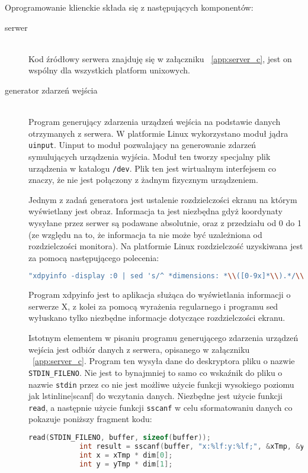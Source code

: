 Oprogramowanie klienckie składa się z następujących komponentów:
\begin{description}
	\item[serwer] \hfill \\
Kod źródłowy serwera znajduję się w załączniku ~\ref{app:server_c}, jest on wspólny dla wszystkich platform unixowych.		
	\item[generator zdarzeń wejścia] \hfill \\ 
		Program generujący zdarzenia urządzeń wejścia na podstawie danych otrzymanych z serwera. W platformie Linux wykorzystano moduł jądra \lstinline|uinput|. Uinput to moduł pozwalający na generowanie zdarzeń symulujących urządzenia wyjścia. Moduł ten tworzy specjalny plik urządzenia w katalogu \lstinline|/dev|. Plik ten jest wirtualnym interfejsem co znaczy, że nie jest połączony z żadnym fizycznym urządzeniem.

		Jednym z zadań generatora jest ustalenie rozdzielczości ekranu na którym wyświetlany jest obraz. Informacja ta jest niezbędna gdyż koordynaty wysyłane przez serwer są podawane absolutnie, oraz z przedziału od 0 do 1 (ze względu na to, że informacja ta nie może być uzależniona od rozdzielczości monitora). Na platformie Linux rozdzielczość uzyskiwana jest za pomocą następującego polecenia:
		\begin{lstlisting}[language=bash]
		"xdpyinfo -display :0 | sed 's/^ *dimensions: *\\([0-9x]*\\).*/\\1/;t;d'";
		\end{lstlisting}
		Program xdpyinfo jest to aplikacja służąca do wyświetlania informacji o serwerze X, z kolei za pomocą wyrażenia regularnego i programu sed wyłuskano tylko niezbędne informacje dotyczące rozdzielczości ekranu.

		Istotnym elementem w pisaniu programu generującego zdarzenia urządzeń wejścia jest odbiór danych z serwera, opisanego w załączniku ~\ref{app:server_c}. Program ten wysyła dane do deskryptora pliku o nazwie \lstinline|STDIN_FILENO|. Nie jest to bynajmniej to samo co wskaźnik do pliku o nazwie \lstinline|stdin| przez co nie jest możliwe użycie funkcji wysokiego poziomu jak lstinline|scanf| do wczytania danych. Niezbędne jest użycie funkcji \lstinline|read|, a następnie użycie funkcji \lstinline|sscanf| w celu sformatowaniu danych co pokazuje poniższy fragment kodu:

		\begin{lstlisting}[language=c]
			read(STDIN_FILENO, buffer, sizeof(buffer));
			int result = sscanf(buffer, "x:%lf:y:%lf;", &xTmp, &yTmp);
			int x = xTmp * dim[0];
			int y = yTmp * dim[1];
		\end{lstlisting}


\end{description}

